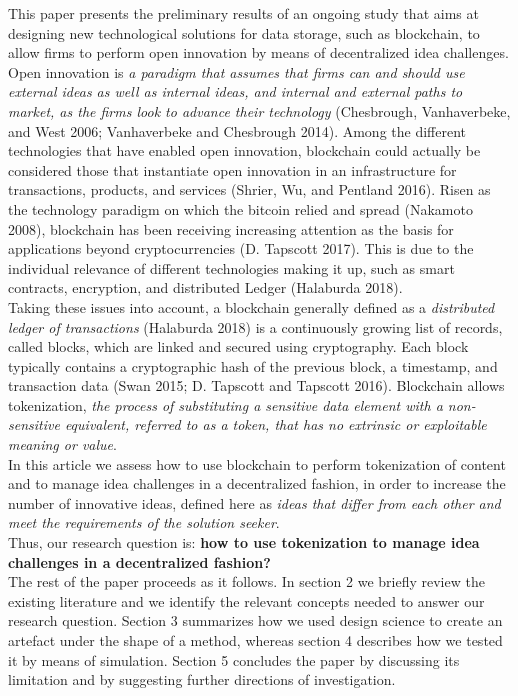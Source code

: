 \documentclass[]{elsarticle} %
\begin{document}
This paper presents the preliminary results of an ongoing study that
aims at designing new technological solutions for data storage, such as
blockchain, to allow firms to perform open innovation by means of
decentralized idea challenges. Open innovation is \emph{a paradigm that
assumes that firms can and should use external ideas as well as internal
ideas, and internal and external paths to market, as the firms look to
advance their technology} (Chesbrough, Vanhaverbeke, and West 2006;
Vanhaverbeke and Chesbrough 2014). Among the different technologies that
have enabled open innovation, blockchain could actually be considered
those that instantiate open innovation in an infrastructure for
transactions, products, and services (Shrier, Wu, and Pentland 2016).
Risen as the technology paradigm on which the bitcoin relied and spread
(Nakamoto 2008), blockchain has been receiving increasing attention as
the basis for applications beyond cryptocurrencies (D. Tapscott 2017).
This is due to the individual relevance of different technologies making
it up, such as smart contracts, encryption, and distributed Ledger
(Halaburda 2018).\\
Taking these issues into account, a blockchain generally defined as a
\emph{distributed ledger of transactions} (Halaburda 2018) is a
continuously growing list of records, called blocks, which are linked
and secured using cryptography. Each block typically contains a
cryptographic hash of the previous block, a timestamp, and transaction
data (Swan 2015; D. Tapscott and Tapscott 2016). Blockchain allows
tokenization, \emph{the process of substituting a sensitive data element
with a non-sensitive equivalent, referred to as a token, that has no
extrinsic or exploitable meaning or value}.\\
In this article we assess how to use blockchain to perform tokenization
of content and to manage idea challenges in a decentralized fashion, in
order to increase the number of innovative ideas, defined here as
\emph{ideas that differ from each other and meet the requirements of the
solution seeker}.\\
Thus, our research question is: \textbf{how to use tokenization to
manage idea challenges in a decentralized fashion?}\\
The rest of the paper proceeds as it follows. In section 2 we briefly
review the existing literature and we identify the relevant concepts
needed to answer our research question. Section 3 summarizes how we used
design science to create an artefact under the shape of a method,
whereas section 4 describes how we tested it by means of simulation.
Section 5 concludes the paper by discussing its limitation and by
suggesting further directions of investigation.
\end{document}
